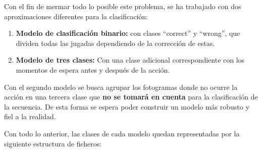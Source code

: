 \documentclass[12pt]{report} %
\begin{document}
    Con el fin de mermar todo lo posible este problema, se ha trabajado con
    dos aproximaciones diferentes para la clasificación: 

%    

    \begin{enumerate}
        \item \textbf{Modelo de clasificación binario:} con clases ``correct'' y ``wrong'', que dividen todas las jugadas dependiendo de la corrección de estas.
        \item \textbf{Modelo de tres clases:} Con una clase adicional correspondiente con los momentos de espera antes y después de la acción.
    \end{enumerate}

    Con el segundo modelo se busca agrupar los fotogramas donde no ocurre la
    acción en una tercera clase que \textbf{no se tomará en cuenta} para la
    clasificación de la secuencia. De esta forma se espera poder construir un
    modelo más robusto y fiel a la realidad.

    Con todo lo anterior, las clases de cada modelo quedan representadas por la siguiente estructura de ficheros:
\end{document}
